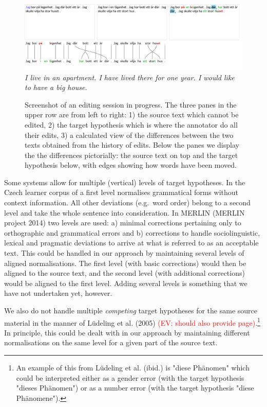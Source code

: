 \documentclass[10pt, a4paper]{article}
\begin{document}
\begin{figure}
\includegraphics[width=\textwidth, trim={0 1cm 0 0}, clip]{screenshot.pdf}
\emph{\small I live in an apartment. I have lived there for one year. I would like to have a big house.}
\caption{Screenshot of an editing session in progress. The three panes in the upper row are from left to right:
1) the source text which cannot be edited,
2) the target hypothesis which is where the annotator do all their edits,
3) a calculated view of the differences between the two texts obtained from the history of edits.
Below the panes we display the the differences pictorially:
the source text on top and the target hypothesis below, with edges
showing how words have been moved.
\label{fig:screenshot}
}
\end{figure}

Some systems allow for multiple (vertical) levels of target hypotheses. In the Czech learner corpus of  a
first level normalises grammatical forms without context information. All other deviations (e.g.\ word order) belong to a second level and take the whole sentence into consideration.
In MERLIN (MERLIN project 2014) two levels are used: a) minimal corrections pertaining only to orthographic and grammatical errors and b) corrections to handle sociolinguistic, lexical and pragmatic deviations to arrive at what is referred to as an acceptable text. This could be handled in our approach by maintaining several levels of aligned normalisations. The first level (with basic corrections) would then be aligned to the source text, and the second level (with additional corrections) would be aligned to the first level. Adding several levels is something that we have not undertaken yet, however.

We also do not handle multiple {\em competing} target hypotheses for the same source material in the manner of L{\"u}deling et al. (2005) \textcolor{red}{(EV: should also provide page)}.\footnote{An example of this from L{\"u}deling et al. (ibid.) is "diese Ph{\"a}nomen" which could be interpreted either as a gender error (with the target hypothesis "dieses Ph{\"a}nomen") or as a number error (with the target hypothesis "diese Ph{\"a}nomene").} In principle, this could be dealt with in our approach by maintaining different normalisations on the same level for a given part of the source text.
\end{document}
